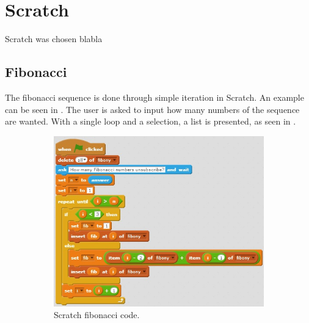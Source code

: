 \section{Scratch}
\label{sec:scratch}

Scratch was chosen blabla 

\subsection{Fibonacci}
The fibonacci sequence is done through simple iteration in Scratch. An example can be seen in . The user is asked to input how many numbers of the sequence are wanted. With a single loop and a selection, a list is presented, as seen in .

\begin{figure}[h]
  \centering
    \begin{subfigure}[b]{0.45\textwidth}
    \begin{center}
      \includegraphics[scale=0.7]{./pics/scratch_fibo_code}
      \caption{Scratch fibonacci code.}
      \label{fig:scratch_fibo_code}
    \end{center}
    \end{subfigure}
    ~
    \begin{subfigure}[b]{0.45\textwidth}
    \begin{center}

\end{center}
\end{subfigure}
\end{figure}
